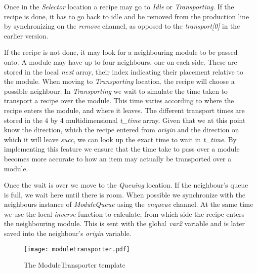 Once in the \emph{Selector} location a recipe may go to \emph{Idle} or \emph{Transporting}. If the recipe is done, it has to go back to idle and be removed from the production line by synchronizing on the \emph{remove} channel, as opposed to the \emph{transport[0]} in the earlier version.

If the recipe is not done, it may look for a neighbouring module to be passed onto. A module may have up to four neighbours, one on each side. These are stored in the local \emph{next} array, their index indicating their placement relative to the module. When moving to \emph{Transporting} location, the recipe will choose a possible neighbour. In \emph{Transporting} we wait to simulate the time taken to transport a recipe over the module. This time varies according to where the recipe enters the module, and where it leaves. The different transport times are stored in the 4 by 4 multidimensional \emph{t\_time} array. Given that we at this point know the direction, which the recipe entered from \emph{origin} and the direction on which it will leave \emph{succ}, we can look up the exact time to wait in \emph{t\_time}. By implementing this feature we ensure that the time take to pass over a module becomes more accurate to how an item may actually be transported over a module. 

Once the wait is over we move to the \emph{Queuing} location. If the neighbour's queue is full, we wait here until there is room. When possible we synchronize with the neighbours instance of \emph{ModuleQueue} using the \emph{enqueue} channel. At the same time we use the local \emph{inverse} function to calculate, from which side the recipe enters the neighbouring module. This is sent with the global \emph{var2} variable and is later saved into the neighbour's \emph{origin} variable. 

\begin{figure}[h]
\centering
\texttt{[image: moduletransporter.pdf]}
\caption{The ModuleTransporter template}
\label{fig:moduletransporter}
\end{figure}


